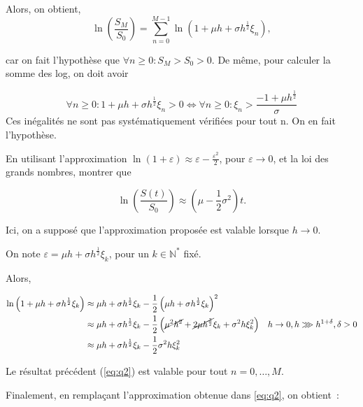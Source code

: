 \documentclass[answers, 10pt]{exam}
\begin{document}
\begin{questions}
\begin{solutionorbox}
		Alors, on obtient,
		\begin{equation}\label{eq:q2}
			\ln \left( \frac{S_M}{S_0} \right) = \sum_{n=0}^{M-1} \ln(1 + \mu h + \sigma h^{\frac{1}{2}} \xi_n)
			,
		\end{equation}

		car on fait l'hypothèse que $\forall n \geq 0 : S_M > S_0 > 0$. De même, pour calculer la somme des log, on doit avoir
		
		$$\forall n \geq 0 : 1 + \mu h + \sigma h^{\frac{1}{2}} \xi_n > 0 \iff \forall n \geq 0 : \xi_n > \frac{-1 + \mu h^{\frac{1}{2}}}{\sigma}  $$
		Ces inégalités ne sont pas systématiquement vérifiées pour tout n. On en fait l'hypothèse.

	\end{solutionorbox}

	\question

	En utilisant l'approximation $\ln(1 + \varepsilon) \approx \varepsilon - \frac{\varepsilon^2}{2}$, pour $\varepsilon \to 0$, et la loi des grands nombres, montrer que

	\begin{equation*}
		\ln \left(  \frac{S(t)}{S_0} \right) \approx \left( \mu - \frac{1}{2} \sigma^2 \right)t.
	\end{equation*}

	Ici, on a supposé que l'approximation proposée est valable lorsque $h\to 0$.

	\begin{solutionorbox}
		On note $\varepsilon = \mu h + \sigma h ^{\frac{1}{2}} \xi_k$,
		pour un $k\in \mathbb{N}^*$ fixé.

		Alors,

		\begin{align}\label{eq:approx}
			\ln \left( 1 + \mu h + \sigma h^{\frac{1}{2}}\xi_k \right) &\approx \mu h + \sigma h^{\frac{1}{2}} \xi_k - \frac{1}{2} \left( \mu h + \sigma h^{\frac{1}{2}}\xi_k \right)^2\\
										   &\approx \mu h + \sigma h^{\frac{1}{2}} \xi_k - \frac{1}{2} \left( \cancel{\mu^2 h^2} + \cancel{2\mu h^{\frac{3}{2}}} \xi_k  + \sigma^2 h \xi_k^2 \right) & h\to 0, h\ggg h^{1 + \delta}, \delta > 0
\\
									      &\approx \mu h + \sigma h^{\frac{1}{2}} \xi_k - \frac{1}{2} \sigma^2 h \xi_k^2 	
		\end{align}

		Le résultat précédent (\cref{eq:q2}) est valable pour tout
		$n=0,\dots,M$.

		Finalement, en remplaçant l'approximation obtenue dans
		\cref{eq:q2}, on obtient~:


\end{solutionorbox}
\end{questions}
\end{document}
